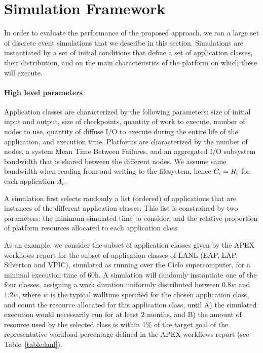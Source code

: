 
\section{Simulation Framework}
\label{sec:simulator}

In order to evaluate the performance of the proposed approach, we ran
a large set of discrete event simulations that we describe in this
section. Simulations are instantiated by a set of initial conditions
that define a set of application classes, their distribution, and on
the main characteristics of the platform on which these will execute.

\paragraph*{High level parameters}
Application classes are characterized by the following parameters:
size of initial input and output, size of checkpoints, quantity of
work to execute, number of nodes to use, quantity of diffuse I/O to
execute during the entire life of the application, and execution time.
Platforms are characterized by the number of nodes, a system Mean Time
Between Failures, and an aggregated I/O subsystem bandwidth that is
shared between the different nodes. We assume same bandwidth when
reading from and writing to the filesystem, hence $C_{i}=R_{i}$
for each application $A_{i}$.

A simulation first selects randomly a list (ordered) of applications
that are instances of the different application classes. This list is
constrained by two parameters: the minimum simulated time to consider,
and the relative proportion of platform resources allocated to each
application class.

As an example, we consider the subset of application classes given by
the APEX workflows report for the subset of application classes of
LANL (EAP, LAP, Silverton and VPIC), simulated as running over the
Cielo supercomputer, for a minimal execution time of 60h. A simulation
will randomly instantiate one of the four classes, assigning a work
duration uniformly distributed between $0.8w$ and $1.2w$, where $w$ is
the typical walltime specified for the chosen application class, and
count the resource allocated for this application class, until A) the
simulated execution would necessarily run for at least 2 months, and B) the
amount of resource used by the selected class is within 1\% of the
target goal of the representative workload percentage defined in the
APEX workflows report (see Table~\ref{table:lanl}).

